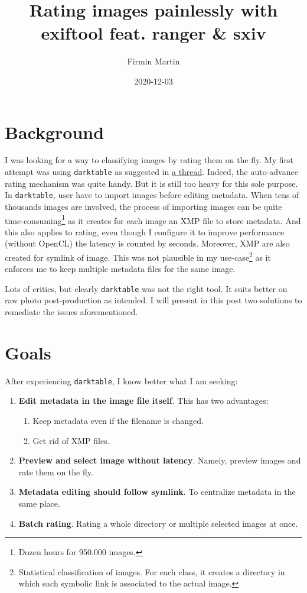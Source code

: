 \documentclass[11pt]{article}
\author{Firmin Martin}
\date{2020-12-03}
\title{Rating images painlessly with exiftool feat. ranger \& sxiv}
\begin{document}
\maketitle
\tableofcontents


\section{Background}
\label{sec:orga8b07d5}
I was looking for a way to classifying images by rating them on the fly.
My first attempt was using \texttt{darktable} as suggested in \href{https://discuss.pixls.us/t/quick-rating-and-auto-advance-in-linux-a-la-photo-mechanic/3446}{a thread}. Indeed, the
auto-advance rating mechanism was quite handy. But it is still
too heavy for this sole purpose. In \texttt{darktable}, user have to import images before
editing metadata. When tens of thousands images are involved, the process of
importing images can be quite time-consuming\footnote{Dozen hours for 950.000 images.} as it creates for each image
an XMP file to store metadata. And this also applies to rating, even though I 
configure it to improve performance (without OpenCL) the latency is counted by seconds.
Moreover, XMP are also created for symlink of image. This was not plausible
in my use-case\footnote{Statistical classification of images. For each class, it creates
a directory in which each symbolic link is associated to the actual image.} as it enforces me to keep multiple metadata files for the same image.

Lots of critics, but clearly \texttt{darktable} was not the right tool. It suits
better on raw photo post-production as intended. I will present in this post two
solutions to remediate the issues aforementioned.

\section{Goals}
\label{sec:orga59b243}
After experiencing \texttt{darktable}, I know better what I am seeking:
\begin{enumerate}
\item \textbf{Edit metadata in the image file itself}. This has two advantages:
\begin{enumerate}
\item Keep metadata even if the filename is changed.
\item Get rid of XMP files.
\end{enumerate}
\item \textbf{Preview and select image without latency}. Namely, preview images and rate them on the fly.
\item \textbf{Metadata editing should follow symlink}. To centralize metadata in the same place.
\item \textbf{Batch rating}. Rating a whole directory or multiple selected images at once.
\end{enumerate}
\end{document}
